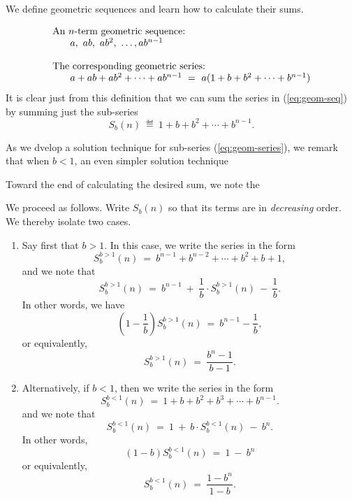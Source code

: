 \documentclass{article}
\begin{document}
We define geometric sequences and learn how to calculate their sums.

\begin{equation}
\label{eq:geom-seq}
\begin{array}{l}
\mbox{An $n$-term geometric sequence:} \\
\hspace*{.25in}a, \ ab, \ ab^2, \ \ldots, ab^{n-1} \\
\\
\mbox{The corresponding geometric series:} \\
\hspace*{.25in}a + ab + ab^2 + \cdots + ab^{n-1} \ = \
 a (1+ b + b^2 + \cdots + b^{n-1})
\end{array}
\end{equation}
It is clear just from this definition that we can sum the series in
(\ref{eq:geom-seq}) by summing just the sub-series
\begin{equation}
\label{eq:geom-series}
S_{b}(n) \ \eqdef \
1+ b + b^2 + \cdots + b^{n-1}.
\end{equation}

As we dvelop a solution technique for sub-series
(\ref{eq:geom-series}), we remark that when $b < 1$, an even simpler
solution technique

Toward the end of calculating the desired sum, we note the 



We proceed as follows.  Write $S_{b}(n)$ so that its terms are in {\em
  decreasing} order.  We thereby isolate two cases.
\begin{enumerate}
\item
Say first that $b > 1$.  In this case, we write the series in the form
\[ S^{b>1}_{b}(n) \ = \ b^{n-1} + b^{n-2} + \cdots + b^2 + b + 1, \]
and we note that
\[ S^{b>1}_{b}(n) \ = \
b^{n-1} \ + \ \frac{1}{b} \cdot S^{b>1}_{b}(n) \ - \ \frac{1}{b}. \]
In other words, we have
\[ \left( 1 - \frac{1}{b} \right)  S^{b>1}_{b}(n) \ = \ b^{n-1} -
\frac{1}{b}, \]
or equivalently,
\begin{equation}
\label{eq:geom-sum:b>1}
S^{b>1}_{b}(n) \ = \ \frac{b^{n}- 1}{b - 1}.
\end{equation}

\item
Alternatively, if $b < 1$, then we write the series in the form
\[ S^{b<1}_{b}(n) \ = \ 1+ b + b^2 + b^3 + \cdots + b^{n-1}. \]
and we note that
\[ S^{b<1}_{b}(n) \ = \
1 \ + \ b \cdot S^{b<1}_{b}(n) \ - \ b^n. \] 
In other words,
\[ (1-b) S^{b<1}_{b}(n) \ = \ 1 \ - \ b^n \]
or equivalently,
\begin{equation}
\label{eq:geom-sum:b<1}
S^{b<1}_{b}(n) \ = \ \frac{1 - b^n}{1-b}.
\end{equation}
\end{enumerate}
\end{document}
